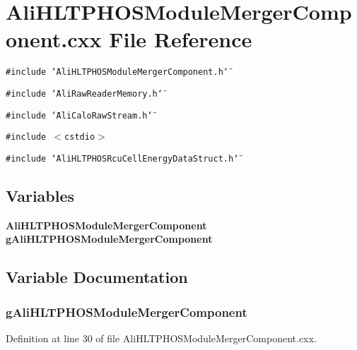 \section{Ali\-HLTPHOSModule\-Merger\-Component.cxx File Reference}
\label{AliHLTPHOSModuleMergerComponent_8cxx}


{\tt \#include \char`\"{}Ali\-HLTPHOSModule\-Merger\-Component.h\char`\"{}}\par
{\tt \#include \char`\"{}Ali\-Raw\-Reader\-Memory.h\char`\"{}}\par
{\tt \#include \char`\"{}Ali\-Calo\-Raw\-Stream.h\char`\"{}}\par
{\tt \#include $<$cstdio$>$}\par
{\tt \#include \char`\"{}Ali\-HLTPHOSRcu\-Cell\-Energy\-Data\-Struct.h\char`\"{}}\par
\subsection*{Variables}
\begin{CompactItemize}
\item 
{\bf Ali\-HLTPHOSModule\-Merger\-Component} {\bf g\-Ali\-HLTPHOSModule\-Merger\-Component}
\end{CompactItemize}


\subsection{Variable Documentation}
\subsubsection{ {\bf g\-Ali\-HLTPHOSModule\-Merger\-Component}}\label{AliHLTPHOSModuleMergerComponent_8cxx_a0}




Definition at line 30 of file Ali\-HLTPHOSModule\-Merger\-Component.cxx.